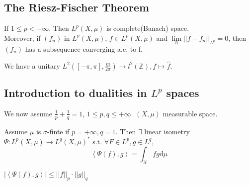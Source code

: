 \subsection{The Riesz-Fischer Theorem}
\begin{theorem}
    If  $ 1 \leq  p<+\infty $. Then  $ L^p(X,\mu) $ is complete(Banach) space.\\
    Moreover, if  $ (f_n)  $ in  $ L^p(X,\mu) $,  $ f\in L^p(X,\mu) $ and  $ \lim\limits_n ||f-f_n||_{L^p}=0 $, then  $ (f_n ) $ has a subsequence converging a.e. to f.   
\end{theorem}
\begin{corollary}
    We have a unitary  $ L^2([-\pi,\pi],\frac{m}{2\pi})\rightarrow l^2(\mathbb{Z}), f\mapsto \hat{f}  $. 
\end{corollary}
\subsection{Introduction to dualities in  $ L^p $ spaces}
We now assume  $ \frac{1}{p}+\frac{1}{q}=1 $,  $ 1 \leq p,q \leq +\infty $.  $ (X,\mu) $ measurable space.
\begin{proposition}
    Assume  $ \mu  $ is  $ \sigma  $-finte if  $ p=+\infty,q=1 $. Then  $ \exists  $ linear isometry  $ \Psi:L^p(X,\mu)\rightarrow L^q(X,\mu)^* $ s.t.  $ \forall F\in L^p,g\in L^q $,  \[\left<\Psi(f),g\right>=\int_X fg \mathrm{d}\mu \]  
\end{proposition}  
\begin{proposition}
     $ \left|\left<\Psi(f),g\right>\right| \leq ||f||_p\cdot||g||_q $  
\end{proposition}